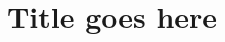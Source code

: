 \documentclass[12pt]{article}
\begin{document}
\title{Title goes here}


\maketitle


%

%

%




%
\end{document}
